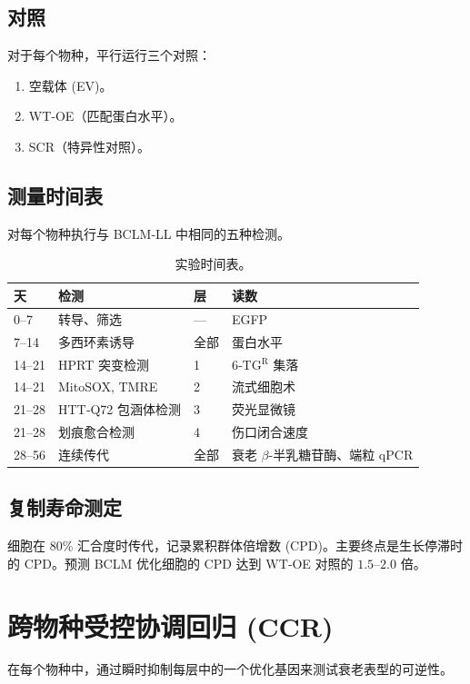 \documentclass[12pt,a4paper]{article}
\begin{document}
	\subsection{对照}
	对于每个物种，平行运行三个对照：
	\begin{enumerate}
		\item 空载体 (EV)。
		\item WT‑OE（匹配蛋白水平）。
		\item SCR（特异性对照）。
	\end{enumerate}
	
	\subsection{测量时间表}
	对每个物种执行与 BCLM‑LL 中相同的五种检测。
	
	\begin{table}[H]
		\centering
		\caption{实验时间表。}
		\label{tab:schedule}
		\begin{tabular}{@{}llll@{}}
			\toprule
			\textbf{天} & \textbf{检测} & \textbf{层} & \textbf{读数} \\
			\midrule
			0–7   & 转导、筛选 & --- & EGFP \\
			7–14  & 多西环素诱导 & 全部 & 蛋白水平 \\
			14–21 & HPRT 突变检测 & 1 & 6‑TG\(^{\mathrm{R}}\) 集落 \\
			14–21 & MitoSOX, TMRE & 2 & 流式细胞术 \\
			21–28 & HTT‑Q72 包涵体检测 & 3 & 荧光显微镜 \\
			21–28 & 划痕愈合检测 & 4 & 伤口闭合速度 \\
			28–56 & 连续传代 & 全部 & 衰老 \(\beta\)-半乳糖苷酶、端粒 qPCR \\
			\bottomrule
		\end{tabular}
	\end{table}
	
	\subsection{复制寿命测定}
	细胞在 80\% 汇合度时传代，记录累积群体倍增数 (CPD)。主要终点是生长停滞时的 CPD。预测 BCLM 优化细胞的 CPD 达到 WT‑OE 对照的 \(1.5\)–\(2.0\) 倍。
	
	\section{跨物种受控协调回归 (CCR)}
	\label{sec:CCR}
	在每个物种中，通过瞬时抑制每层中的一个优化基因来测试衰老表型的可逆性。
	
\end{document}
